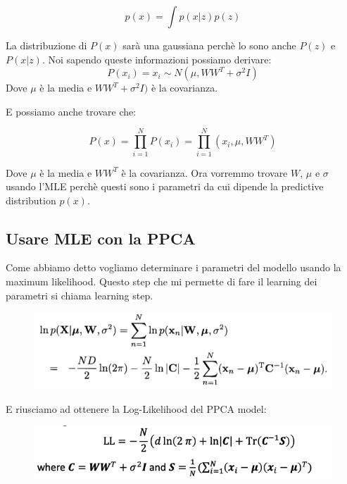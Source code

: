 \documentclass[14pt]{extreport}
\begin{document}
$$p(x) = \int p(x|z)p(z)$$

La distribuzione di $P(x)$ sarà una gaussiana perchè lo sono anche $P(z)$ e $P(x|z)$. Noi sapendo queste informazioni possiamo derivare:
$$P(x_i) = x_i \sim N(\mu, WW^T + \sigma^2I)$$ Dove $\mu$ è la media e $WW^T + \sigma^2I)$ è la covarianza.

E possiamo anche trovare che:

$$P(x) = \prod_{i=1}^N P(x_i) = \prod_{i=1}^N (x_i, \mu, WW^T)$$

Dove $\mu$ è la media e $WW^T$ è la covarianza. Ora vorremmo trovare $W$, $\mu$ e $\sigma$ usando l'MLE perchè questi sono i parametri da cui dipende
la predictive distribution $p(x)$.

\subsection{Usare MLE con la PPCA}

Come abbiamo detto vogliamo determinare i parametri del modello usando la maximum likelihood. Questo step che mi permette di fare il learning dei
parametri si chiama learning step.

\begin{figure}[H]
	\centering
	\includegraphics[width=0.7\linewidth]{485.jpeg}
\end{figure}

E riusciamo ad ottenere la Log-Likelihood del PPCA model:

\begin{figure}[H]
	\centering
	\includegraphics[width=0.7\linewidth]{486.jpeg}
\end{figure}
\end{document}
